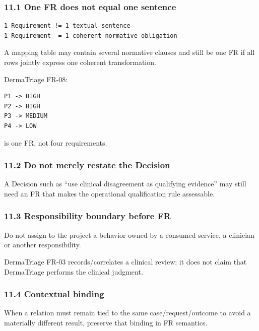 \documentclass[11pt,a4paper]{article}
\begin{document}
\subsubsection{11.1 One FR does not equal one
sentence}\label{111-one-fr-does-not-equal-one-sentence}

\begin{verbatim}
1 Requirement != 1 textual sentence
1 Requirement  = 1 coherent normative obligation
\end{verbatim}

A mapping table may contain several normative clauses and still be one
FR if all rows jointly express one coherent transformation.

DermaTriage FR-08:

\begin{verbatim}
P1 -> HIGH
P2 -> HIGH
P3 -> MEDIUM
P4 -> LOW
\end{verbatim}

is one FR, not four requirements.

\subsubsection{11.2 Do not merely restate the
Decision}\label{112-do-not-merely-restate-the-decision}

A Decision such as ``use clinical disagreement as qualifying evidence''
may still need an FR that makes the operational qualification rule
assessable.

\subsubsection{11.3 Responsibility boundary before
FR}\label{113-responsibility-boundary-before-fr}

Do not assign to the project a behavior owned by a consumed service, a
clinician or another responsibility.

DermaTriage FR-03 records/correlates a clinical review; it does not
claim that DermaTriage performs the clinical judgment.

\subsubsection{11.4 Contextual binding}\label{114-contextual-binding}

When a relation must remain tied to the same case/request/outcome to
avoid a materially different result, preserve that binding in FR
semantics.
\end{document}
